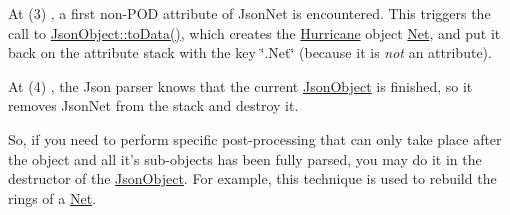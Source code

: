 At {\ttfamily }(3) , a first non-\/\-P\-O\-D attribute of Json\-Net is encountered. This triggers the call to {\ttfamily \hyperlink{classHurricane_1_1JsonObject_a57a845ca64ac8912b35c4dbf75723af6}{Json\-Object\-::to\-Data()}}, which creates the \hyperlink{namespaceHurricane}{Hurricane} object \hyperlink{classHurricane_1_1Net}{Net}, and put it back on the attribute stack with the key {\ttfamily \char`\"{}.\-Net\char`\"{}} (because it is {\itshape not} an attribute).

At {\ttfamily }(4) , the Json parser knows that the current \hyperlink{classHurricane_1_1JsonObject}{Json\-Object} is finished, so it removes Json\-Net from the stack and destroy it.

So, if you need to perform specific post-\/processing that can only take place {\ttfamily after} the object and all it's sub-\/objects has been fully parsed, you may do it in the destructor of the \hyperlink{classHurricane_1_1JsonObject}{Json\-Object}. For example, this technique is used to rebuild the rings of a \hyperlink{classHurricane_1_1Net}{Net}. 